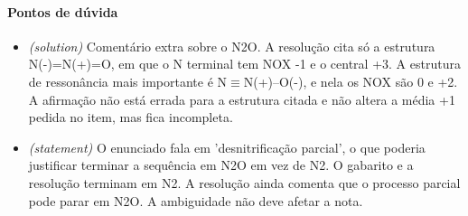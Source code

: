 \documentclass{article}%
\begin{document}
\paragraph{Pontos de dúvida}%
\begin{itemize}%
\item%
\textit{(solution)} Comentário extra sobre o N2O. A resolução cita só a estrutura N(-)=N(+)=O, em que o N terminal tem NOX -1 e o central +3. A estrutura de ressonância mais importante é N$\equiv$N(+)--O(-), e nela os NOX são 0 e +2. A afirmação não está errada para a estrutura citada e não altera a média +1 pedida no item, mas fica incompleta.%
\item%
\textit{(statement)} O enunciado fala em 'desnitrificação parcial', o que poderia justificar terminar a sequência em N2O em vez de N2. O gabarito e a resolução terminam em N2. A resolução ainda comenta que o processo parcial pode parar em N2O. A ambiguidade não deve afetar a nota.%
\end{itemize}%
\end{document}
